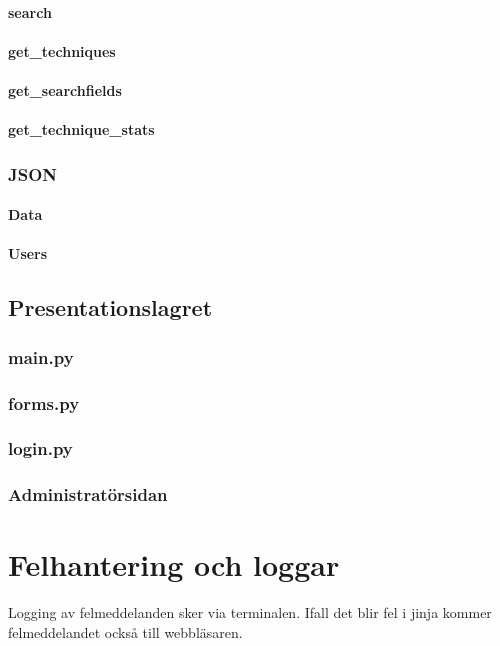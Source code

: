\documentclass{TDP003mall}
\begin{document}
\paragraph{search}
\paragraph{get\_techniques}
\paragraph{get\_searchfields}
\paragraph{get\_technique\_stats}

\subsubsection{JSON}
\paragraph{Data}
\paragraph{Users}

\subsection{Presentationslagret}

\subsubsection{main.py}

\subsubsection{forms.py}

\subsubsection{login.py}

\subsubsection{Administratörsidan}

\section{Felhantering och loggar}
Logging av felmeddelanden sker via terminalen. Ifall det blir fel i jinja kommer felmeddelandet också till webbläsaren.
\end{document}
